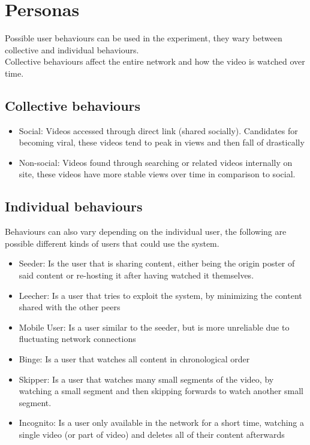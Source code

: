 \section{Personas}
Possible user behaviours can be used in the experiment, they wary between collective and individual behaviours.\\
Collective behaviours affect the entire network and how the video is watched over time.
\subsection{Collective behaviours}
\begin{itemize}
    \item Social:
    Videos accessed through direct link (shared socially). Candidates for becoming viral, these videos tend to peak in views and then fall of drastically
    \item Non-social:
    Videos found through searching or related videos internally on site, these videos have more stable views over time in comparison to social.
\end{itemize}

\subsection{Individual behaviours}
Behaviours can also vary depending on the individual user, the following are possible different kinds of users that could use the system.
\begin{itemize}
    \item Seeder:
    Is the user that is sharing content, either being the origin poster of said content or re-hosting it after having watched it themselves.
    \item Leecher:
    Is a user that tries to exploit the system, by minimizing the content shared with the other peers %
    \item Mobile User:
    Is a user similar to the seeder, but is more unreliable due to fluctuating network connections
    \item Binge:
    Is a user that watches all content in chronological order
    \item Skipper:
    Is a user that watches many small segments of the video, by watching a small segment and then skipping forwards to watch another small segment.
    \item Incognito:
    Is a user only available in the network for a short time, watching a single video (or part of video) and deletes all of their content afterwards
\end{itemize}

